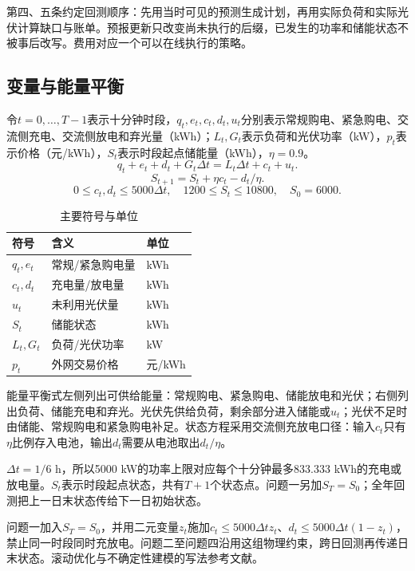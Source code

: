\documentclass[UTF8,12pt,a4paper]{ctexart}
\begin{document}
第四、五条约定回测顺序：先用当时可见的预测生成计划，再用实际负荷和实际光伏计算缺口与账单。预报更新只改变尚未执行的后缀，已发生的功率和储能状态不被事后改写。费用对应一个可以在线执行的策略。
\subsection{变量与能量平衡}
令\(t=0,\ldots,T-1\)表示十分钟时段，\(q_t,e_t,c_t,d_t,u_t\)分别表示常规购电、紧急购电、交流侧充电、交流侧放电和弃光量（kWh）；\(L_t,G_t\)表示负荷和光伏功率（kW），\(p_t\)表示价格（元/kWh），\(S_t\)表示时段起点储能量（kWh），\(\eta=0.9\)。
\begin{equation}\label{eq:balance}
q_t+e_t+d_t+G_t\Delta t=L_t\Delta t+c_t+u_t .
\end{equation}
\begin{equation}\label{eq:soc}
S_{t+1}=S_t+\eta c_t-d_t/\eta .
\end{equation}
\begin{equation}\label{eq:bound}
0\le c_t,d_t\le5000\Delta t,\quad1200\le S_t\le10800,\quad S_0=6000 .
\end{equation}
\begin{table}[H]\centering\caption{主要符号与单位}\label{tab:symbol}\begin{tabular}{lll}\toprule 符号&含义&单位\\\midrule
$q_t,e_t$&常规/紧急购电量&kWh\\ $c_t,d_t$&充电量/放电量&kWh\\ $u_t$&未利用光伏量&kWh\\ $S_t$&储能状态&kWh\\ $L_t,G_t$&负荷/光伏功率&kW\\ $p_t$&外网交易价格&元/kWh\\\bottomrule\end{tabular}\end{table}
能量平衡式左侧列出可供给能量：常规购电、紧急购电、储能放电和光伏；右侧列出负荷、储能充电和弃光。光伏先供给负荷，剩余部分进入储能或\(u_t\)；光伏不足时由储能、常规购电和紧急购电补足。状态方程采用交流侧充放电口径：输入\(c_t\)只有\(\eta\)比例存入电池，输出\(d_t\)需要从电池取出\(d_t/\eta\)。

\(\Delta t=1/6\) h，所以5000 kW的功率上限对应每个十分钟最多833.333 kWh的充电或放电量。\(S_t\)表示时段起点状态，共有\(T+1\)个状态点。问题一另加\(S_T=S_0\)；全年回测把上一日末状态传给下一日初始状态。

问题一加入\(S_T=S_0\)，并用二元变量\(z_t\)施加\(c_t\le5000\Delta t z_t\)、\(d_t\le5000\Delta t(1-z_t)\)，禁止同一时段同时充放电。问题二至问题四沿用这组物理约束，跨日回测再传递日末状态。滚动优化与不确定性建模的写法参考文献\cite{gulotta,honen}。
\end{document}
